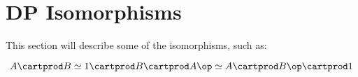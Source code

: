 

\section{DP Isomorphisms}

\begin{publictodo}
    This section will describe some of the isomorphisms, such as:

    \begin{equation}
        A \cartprod B \simeq 1 \cartprod B \cartprod A\op \simeq A \cartprod B\op \cartprod 1
    \end{equation}

\end{publictodo}

